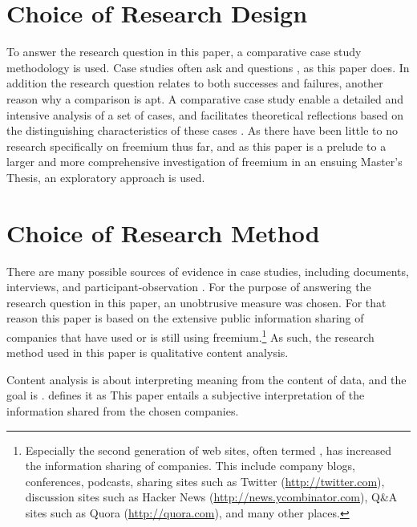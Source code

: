 \section{Choice of Research Design}

To answer the research question in this paper, a comparative case study methodology is used. Case studies often ask  and  questions \citep{tellis1997}, as this paper does. In addition the research question relates to both successes and failures, another reason why a comparison is apt. A comparative case study enable a detailed and intensive analysis of a set of cases, and facilitates theoretical reflections based on the distinguishing characteristics of these cases \citep{bryman2008}. As there have been little to no research specifically on freemium thus far, and as this paper is a prelude to a larger and more comprehensive investigation of freemium in an ensuing Master's Thesis, an exploratory approach is used.

\section{Choice of Research Method}

There are many possible sources of evidence in case studies, including documents, interviews, and participant-observation \citep{tellis1997}. For the purpose of answering the research question in this paper, an unobtrusive measure was chosen. For that reason this paper is based on the extensive public information sharing of companies that have used or is still using freemium.\footnote{Especially the second generation of web sites, often termed , has increased the information sharing of companies. This include company blogs, conferences, podcasts, sharing sites such as Twitter (\url{http://twitter.com}), discussion sites such as Hacker News (\url{http://news.ycombinator.com}), Q\&A sites such as Quora (\url{http://quora.com}), and many other places.} As such, the research method used in this paper is qualitative content analysis.

Content analysis is about interpreting meaning from the content of data, and the goal is  \citep[]{downe1992}. \citet[]{krippendorff2004} defines it as  This paper entails a subjective interpretation of the information shared from the chosen companies.

